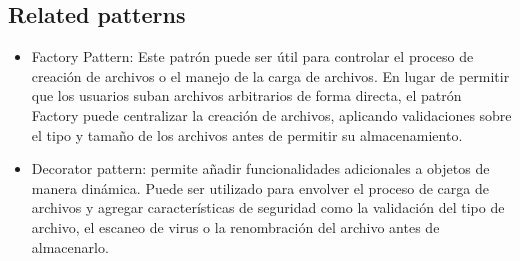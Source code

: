 \subsection*{Related patterns}
\begin{itemize}
    \item Factory Pattern: Este patrón puede ser útil para controlar el proceso de creación de archivos o el manejo de la carga de archivos. En lugar de permitir que los usuarios suban archivos arbitrarios de forma directa, el patrón Factory puede centralizar la creación de archivos, aplicando validaciones sobre el tipo y tamaño de los archivos antes de permitir su almacenamiento.
    \item Decorator pattern: permite añadir funcionalidades adicionales a objetos de manera dinámica. Puede ser utilizado para envolver el proceso de carga de archivos y agregar características de seguridad como la validación del tipo de archivo, el escaneo de virus o la renombración del archivo antes de almacenarlo.
\end{itemize}



